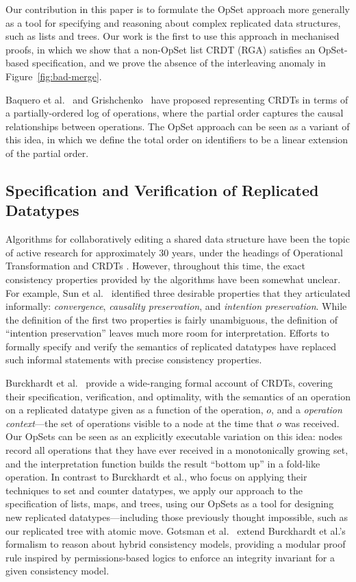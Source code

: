 Our contribution in this paper is to formulate the OpSet approach more generally as a tool for specifying and reasoning about complex replicated data structures, such as lists and trees.
Our work is the first to use this approach in mechanised proofs, in which we show that a non-OpSet list CRDT (RGA) satisfies an OpSet-based specification, and we prove the absence of the interleaving anomaly in Figure~\ref{fig:bad-merge}.

Baquero et al.~\cite{Baquero:2014ed} and Grishchenko~\cite{Grishchenko:2014eh} have proposed representing CRDTs in terms of a partially-ordered log of operations, where the partial order captures the causal relationships between operations.
The OpSet approach can be seen as a variant of this idea, in which we define the total order on identifiers to be a linear extension of the partial order.

\subsection{Specification and Verification of Replicated Datatypes}

Algorithms for collaboratively editing a shared data structure have been the topic of active research for approximately 30 years, under the headings of Operational Transformation \cite{Ellis:1989ue,Ressel:1996wx,Sun:1998vf,Oster:2006tr} and CRDTs \cite{Shapiro:2011wy,Shapiro:2011un}.
However, throughout this time, the exact consistency properties provided by the algorithms have been somewhat unclear.
For example, Sun et al.~\cite{Sun:1998un} identified three desirable properties that they articulated informally: \emph{convergence}, \emph{causality preservation}, and \emph{intention preservation}.
While the definition of the first two properties is fairly unambiguous, the definition of ``intention preservation'' leaves much more room for interpretation.
Efforts to formally specify and verify the semantics of replicated datatypes have replaced such informal statements with precise consistency properties.

Burckhardt et al.~\cite{Burckhardt:2014ft} provide a wide-ranging formal account of CRDTs, covering their specification, verification, and optimality, with the semantics of an operation on a replicated datatype given as a function of the operation, $o$, and a \emph{operation context}---the set of operations visible to a node at the time that $o$ was received.
Our OpSets can be seen as an explicitly executable variation on this idea: nodes record all operations that they have ever received in a monotonically growing set, and the interpretation function builds the result ``bottom up'' in a fold-like operation.
In contrast to Burckhardt et al., who focus on applying their techniques to set and counter datatypes, we apply our approach to the specification of lists, maps, and trees, using our OpSets as a tool for designing new replicated datatypes---including those previously thought impossible, such as our replicated tree with atomic move.
Gotsman et al.~\cite{DBLP:conf/popl/GotsmanYFNS16} extend Burckhardt et al.'s formalism to reason about hybrid consistency models, providing a modular proof rule inspired by permissions-based logics to enforce an integrity invariant for a given consistency model.

